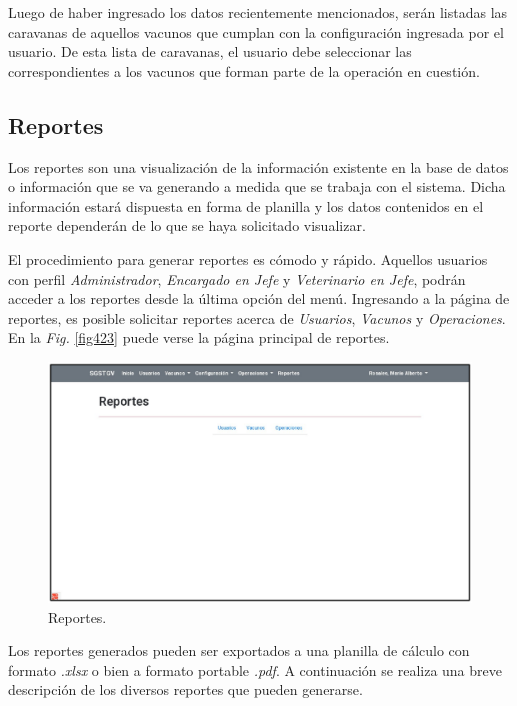 \documentclass[11pt,oneside]{book}
\begin{document}
Luego de haber ingresado los datos recientemente mencionados, serán listadas las caravanas de aquellos vacunos que cumplan con la configuración ingresada por el usuario. De esta lista de caravanas, el usuario debe seleccionar las correspondientes a los vacunos que forman parte de la operación en cuestión.

\subsection{Reportes}\label{Rep}
Los reportes son una visualización de la información existente en la base de datos o información que se va generando a medida que se trabaja con el sistema. Dicha información estará dispuesta en forma de planilla y los datos contenidos en el reporte dependerán de lo que se haya solicitado visualizar.

El procedimiento para generar reportes es cómodo y rápido. Aquellos usuarios con perfil \textit{Administrador}, \textit{Encargado en Jefe} y \textit{Veterinario en Jefe}, podrán acceder a los reportes desde la última opción del menú. Ingresando a la página de reportes, es posible solicitar reportes acerca de \textit{Usuarios}, \textit{Vacunos} y \textit{Operaciones}. En la \textit{Fig.} \eqref{fig423} puede verse la página principal de reportes.

\begin{figure}[tbhp]
\centerline{\includegraphics[scale=0.87]{figs/capitulo_3_desarrollo/fig423.pdf}}
\caption{Reportes.}
\label{fig423}
\end{figure}

Los reportes generados pueden ser exportados a una planilla de cálculo con formato \textit{.xlsx} o bien a formato portable \textit{.pdf}. A continuación se realiza una breve descripción de los diversos reportes que pueden generarse.
\end{document}
